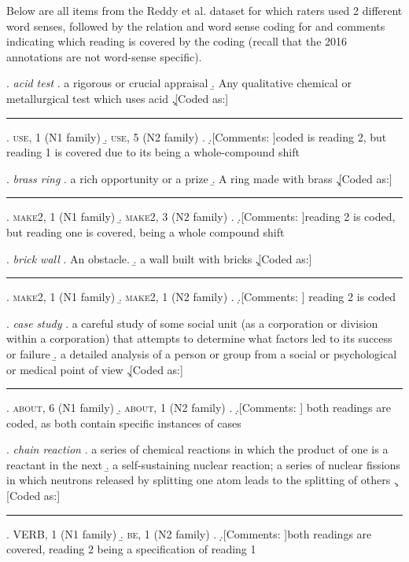 Below are all items from the Reddy et al. dataset for which raters
 used 2 different word senses, followed by the relation
and word sense coding for \citet{BellandSchaefer:2016} and comments
indicating which reading is covered by the coding (recall that the
2016 annotations are not word-sense specific). 

\ex. \emph{acid test}
\a. a rigorous or crucial appraisal 
\b. Any qualitative chemical or metallurgical test which uses acid
\c.[Coded as:] {\rule{4cm}{0cm}}
\a. \textsc{use}, 1 (N1 family)
\b. \textsc{use}, 5 (N2 family)
\z.
\d.[Comments: ]coded is reading 2, but reading 1 is covered due to its being a whole-compound shift

\ex. \emph{brass ring}
\a. a rich opportunity or a prize
\b. A ring made with brass   
\c.[Coded as:] {\rule{4cm}{0cm}}
\a. \textsc{make2}, 1 (N1 family)
\b. \textsc{make2}, 3 (N2 family)
\z.
\d.[Comments: ]reading 2 is coded, but reading one is covered, being a whole compound shift

\pagebreak[4]
\ex. \emph{brick wall}
\a. An obstacle.
\b. a wall built with bricks
\c.[Coded as:] {\rule{4cm}{0cm}}
\a. \textsc{make2}, 1 (N1 family)
\b. \textsc{make2}, 1 (N2 family)
\z.
\d.[Comments: ] reading 2 is coded

\ex. \emph{case study}
\a.     a careful study of some social unit (as a corporation or division within a corporation) that attempts to determine what factors led to its success or failure
\b. a detailed analysis of a person or group from a social or psychological or medical point of view
\c.[Coded as:] {\rule{4cm}{0cm}} 
\a. \textsc{about}, 6 (N1 family)
\b. \textsc{about}, 1 (N2 family)
\z.
\d.[Comments: ] both readings are coded, as both contain specific instances of cases

\ex. \emph{chain reaction}
\a. a series of chemical reactions in which the product of one is a reactant in the next
\b. a self-sustaining nuclear reaction; a series of nuclear fissions in which neutrons released by splitting one atom leads to the splitting of others
\c.[Coded as:] {\rule{4cm}{0cm}}
\a. VERB, 1 (N1 family)
\b. \textsc{be}, 1 (N2 family)
\z.
\d.[Comments: ]both readings are covered, reading 2 being a specification of reading 1

